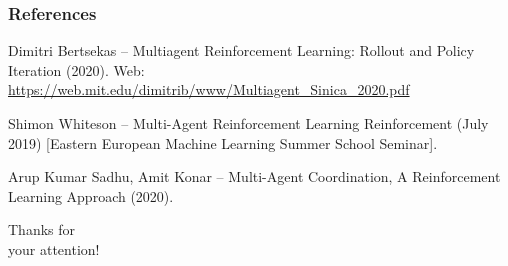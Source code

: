 \documentclass{beamer}
\begin{document}
    \begin{frame}
        \frametitle{References}
        \footnotesize{
            \begin{thebibliography}{10}

                \label{bert20}
                Dimitri Bertsekas -- Multiagent Reinforcement Learning: Rollout and Policy Iteration (2020). Web:
                \url{https://web.mit.edu/dimitrib/www/Multiagent_Sinica_2020.pdf}

                \label{whiteson20}
                Shimon Whiteson -- Multi-Agent Reinforcement Learning Reinforcement (July 2019) [Eastern European Machine Learning Summer School Seminar].


                \label{sadhu20}
                Arup Kumar Sadhu, Amit Konar --
                Multi-Agent Coordination,
                A Reinforcement Learning Approach (2020).


            \end{thebibliography}
        }
    \end{frame}


    \begin{frame}

        \begin{center}
            \Huge Thanks for
            \\
            your attention!
        \end{center}

    \end{frame}

\end{document}
